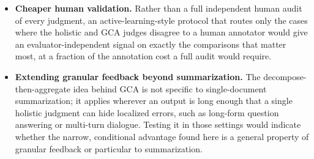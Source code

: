 \begin{itemize}
    A future study could recover this comparison without reintroducing that
    problem by running policy optimization as a separate stage downstream
    of, and independent from, the preference-construction comparison
    established here, rather than folding both into one pipeline.
  \item \textbf{Cheaper human validation.} Rather than a full independent
    human audit of every judgment, an active-learning-style protocol that
    routes only the cases where the holistic and GCA judges disagree to a
    human annotator would give an evaluator-independent signal on exactly
    the comparisons that matter most, at a fraction of the annotation cost
    a full audit would require.
  \item \textbf{Extending granular feedback beyond summarization.} The
    decompose-then-aggregate idea behind GCA is not specific to
    single-document summarization; it applies wherever an output is long
    enough that a single holistic judgment can hide localized errors, such
    as long-form question answering or multi-turn dialogue. Testing it in
    those settings would indicate whether the narrow, conditional advantage
    found here is a general property of granular feedback or particular to
    summarization.
\end{itemize}
